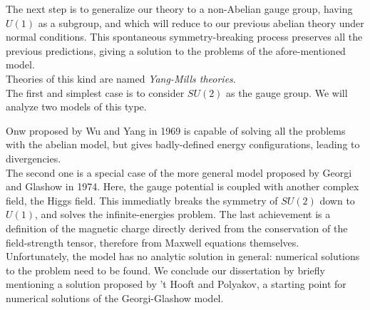 The next step is to generalize our theory to a non-Abelian gauge group, having
$U(1)$ as a subgroup, and which will reduce to our previous abelian theory
under normal conditions.
This spontaneous symmetry-breaking process preserves all the previous predictions,
giving a solution to the problems of the afore-mentioned model.\\
Theories of this kind are named \emph{Yang-Mills theories}.\\

The first and simplest case is to consider $SU(2)$ as the gauge group. We will
analyze two models of this type.

Onw proposed by Wu and Yang in 1969 is capable of solving all the problems with
the abelian model, but gives badly-defined energy configurations, leading
to divergencies.\\
The second one is a special case of the more general model proposed by Georgi and
Glashow in 1974. Here, the gauge potential is coupled with another complex field,
the Higgs field. This immediatly breaks the symmetry of $SU(2)$ down to $U(1)$,
and solves the infinite-energies problem. The last achievement is a definition
of the magnetic charge directly derived from the conservation of the
field-strength tensor, therefore from Maxwell equations themselves.\\

Unfortunately, the model has no analytic solution in general: numerical
solutions to the problem need to be found.
We conclude our dissertation by briefly mentioning a solution proposed
by 't Hooft and Polyakov, a starting point for numerical solutions of the Georgi-Glashow
model.

